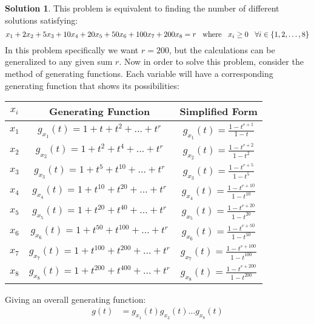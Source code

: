 \documentclass[12pt, letterpaper, onecolumn, conference, final]{IEEEtran}
\theoremstyle{definition}
\newtheorem*{solution*}{Solution}
\theoremstyle{plain}
\begin{document}
\vspace{.3cm}
\begin{solution*}
This problem is equivalent to finding the number of different solutions satisfying:
\begin{equation*}
x_1 + 2x_2 + 5x_3 + 10x_4 + 20x_5 + 50x_6 + 100x_7 + 200x_8 = r \hspace{.3cm} \text{where} \hspace{.3cm} x_i \geq 0 \hspace{.3cm} \forall i \in \{1,2,\dots,8\} 
\end{equation*}
In this problem specifically we want $r=200$, but the calculations can be generalized to any given sum $r$. Now in order to solve this problem, consider the method of generating functions. Each variable will have a corresponding generating function that shows its possibilities:
\begin{center}
\def\arraystretch{2}
\begin{tabular}{| c | c | c |}
\hline
$x_i$ & Generating Function & Simplified Form \\ \hline
$x_1$ & $g_{x_1}(t) = 1 + t + t^2 + \dots + t^r$ & $g_{x_1}(t) = \frac{1 - t^{r+1}}{1-t}$ \\ \hline
$x_2$ & $g_{x_2}(t) = 1 + t^2 + t^4 + \dots + t^r$ & $g_{x_2}(t) = \frac{1 - t^{r+2}}{1-t^2}$ \\ \hline
$x_3$ & $g_{x_3}(t) = 1 + t^5 + t^{10} + \dots + t^r$ & $g_{x_3}(t) = \frac{1 - t^{r+5}}{1-t^5}$ \\ \hline
$x_4$ & $g_{x_4}(t) = 1 + t^{10} + t^{20} + \dots + t^r$ & $g_{x_4}(t) = \frac{1 - t^{r+10}}{1-t^{10}}$ \\ \hline
$x_5$ & $g_{x_5}(t) = 1 + t^{20} + t^{40} + \dots + t^r$ & $g_{x_5}(t) = \frac{1 - t^{r+20}}{1-t^{20}}$ \\ \hline
$x_6$ & $g_{x_6}(t) = 1 + t^{50} + t^{100} + \dots + t^r$ & $g_{x_6}(t) = \frac{1 - t^{r+50}}{1-t^{50}}$ \\ \hline
$x_7$ & $g_{x_7}(t) = 1 + t^{100} + t^{200} + \dots + t^r$ & $g_{x_7}(t) = \frac{1 - t^{r+100}}{1-t^{100}}$ \\ \hline
$x_8$ & $g_{x_8}(t) = 1 + t^{200} + t^{400} + \dots + t^r$ & $g_{x_8}(t) = \frac{1 - t^{r+200}}{1-t^{200}}$ \\ \hline
\end{tabular}
\end{center}
Giving an overall generating function:
\begin{equation*}
\begin{split}
g(t) &= g_{x_1}(t)g_{x_2}(t)\dots g_{x_8}(t) \\

\end{split}
\end{equation*}
\end{solution*}
\end{document}
